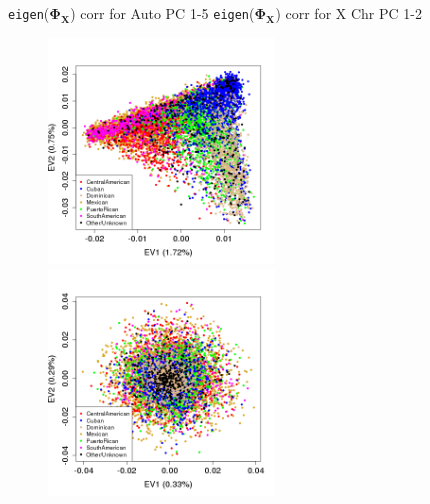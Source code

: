 \documentclass{beamer}
\begin{document}
\begin{frame}
\footnotesize
\texttt{eigen}($\mathbf{\Phi_X}$) corr for Auto PC 1-5 \hspace{1cm} \texttt{eigen}($\mathbf{\Phi_X}$) corr for X Chr PC 1-2
\centering
\begin{figure}
\includegraphics[height=6cm]{../eigen_unrel_adjXkc_adjAutoPC15_xPrunedKC_ev12_col.png}
\includegraphics[height=6cm]{../eigen_unrel_adjxPrunedKC_adjxPC12_ev12_col.png}
\end{figure}
\end{frame}
\end{document}
